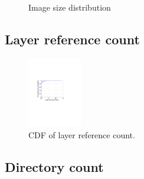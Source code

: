 \begin{figure}[!t]
	\centering
	\caption{Image size distribution}
	\label{fig:image-size}
\end{figure}

\subsection{Layer reference count}

\begin{figure}
	\centering
	\includegraphics[width=0.21\textwidth]{graphs/shared-cnt-cdf.pdf}
	\caption{CDF of layer reference count.
	}
	\label{fig:reference-cnt}
\end{figure}

\subsection{Directory count}

